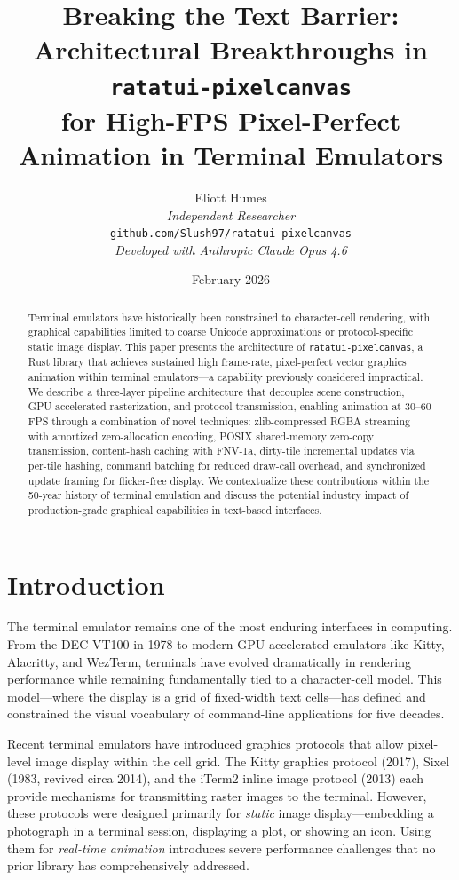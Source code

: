 \documentclass[11pt, a4paper, twocolumn]{article}
\title{%
    \vspace{-1.5em}
    \textbf{\Large Breaking the Text Barrier:}\\[0.3em]
    \textbf{\large Architectural Breakthroughs in \texttt{ratatui-pixelcanvas}\\
    for High-FPS Pixel-Perfect Animation in Terminal Emulators}
}
\author{
    Eliott Humes\\
    \small \textit{Independent Researcher}\\
    \small \texttt{github.com/Slush97/ratatui-pixelcanvas}\\[0.3em]
    \small \textit{Developed with Anthropic Claude Opus 4.6}
}
\date{February 2026}
\begin{document}
\maketitle

\begin{abstract}
Terminal emulators have historically been constrained to character-cell rendering, with graphical capabilities limited to coarse Unicode approximations or protocol-specific static image display.
This paper presents the architecture of \texttt{ratatui-pixelcanvas}, a Rust library that achieves sustained high frame-rate, pixel-perfect vector graphics animation within terminal emulators---a capability previously considered impractical.
We describe a three-layer pipeline architecture that decouples scene construction, GPU-accelerated rasterization, and protocol transmission, enabling animation at 30--60 FPS through a combination of novel techniques: zlib-compressed RGBA streaming with amortized zero-allocation encoding, POSIX shared-memory zero-copy transmission, content-hash caching with FNV-1a, dirty-tile incremental updates via per-tile hashing, command batching for reduced draw-call overhead, and synchronized update framing for flicker-free display.
We contextualize these contributions within the 50-year history of terminal emulation and discuss the potential industry impact of production-grade graphical capabilities in text-based interfaces.
\end{abstract}

\section{Introduction}
\label{sec:introduction}

The terminal emulator remains one of the most enduring interfaces in computing.
From the DEC VT100 in 1978 to modern GPU-accelerated emulators like Kitty, Alacritty, and WezTerm, terminals have evolved dramatically in rendering performance while remaining fundamentally tied to a character-cell model.
This model---where the display is a grid of fixed-width text cells---has defined and constrained the visual vocabulary of command-line applications for five decades.

Recent terminal emulators have introduced graphics protocols that allow pixel-level image display within the cell grid.
The Kitty graphics protocol (2017), Sixel (1983, revived circa 2014), and the iTerm2 inline image protocol (2013) each provide mechanisms for transmitting raster images to the terminal.
However, these protocols were designed primarily for \emph{static} image display---embedding a photograph in a terminal session, displaying a plot, or showing an icon.
Using them for \emph{real-time animation} introduces severe performance challenges that no prior library has comprehensively addressed.
\end{document}
